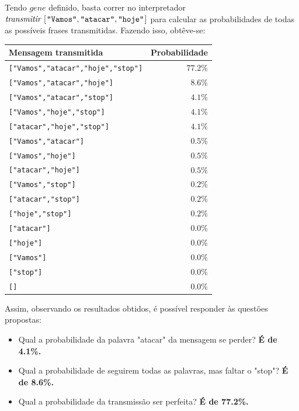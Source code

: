\documentclass[11pt, a4paper, fleqn]{article}
\newcommand{\Varid}[1]{\mathit{#1}}
\begin{document}
Tendo \ensuremath{\Varid{gene}} definido, basta correr no interpretador \ensuremath{\Varid{transmitir}\;[\mskip1.5mu \text{\ttfamily \char34 Vamos\char34},\text{\ttfamily \char34 atacar\char34},\text{\ttfamily \char34 hoje\char34}\mskip1.5mu]} para calcular as probabilidades de todas as possíveis frases transmitidas. Fazendo isso, obtêve-se:

\begin{center}
\begin{tabular}{l r}
Mensagem transmitida & Probabilidade \\ \hline
\texttt{["Vamos","atacar","hoje","stop"]} & $77.2\%$ \\
\texttt{["Vamos","atacar","hoje"]} & $8.6\%$ \\
\texttt{["Vamos","atacar","stop"]} & $4.1\%$ \\
\texttt{["Vamos","hoje","stop"]} & $4.1\%$ \\
\texttt{["atacar","hoje","stop"]} & $4.1\%$ \\
\texttt{["Vamos","atacar"]} & $0.5\%$ \\
\texttt{["Vamos","hoje"]} & $0.5\%$ \\
\texttt{["atacar","hoje"]} & $0.5\%$ \\
\texttt{["Vamos","stop"]} & $0.2\%$ \\
\texttt{["atacar","stop"]} & $0.2\%$ \\
\texttt{["hoje","stop"]} & $0.2\%$ \\
\texttt{["atacar"]} & $0.0\%$ \\
\texttt{["hoje"]} & $0.0\%$ \\
\texttt{["Vamos"]} & $0.0\%$ \\
\texttt{["stop"]} & $0.0\%$ \\
\texttt{[]} & $0.0\%$ \\
\end{tabular}
\end{center}

Assim, observando os resultados obtidos, é possível responder às questões propostas:

\begin{itemize}
     \item Qual a probabilidade da palavra "atacar" da mensagem se perder? 
     \textbf {É de 4.1\%.}
     \item Qual a probabilidade de seguirem todas as palavras, mas faltar o "stop"?
     \textbf {É de 8.6\%.}
     \item Qual a probabilidade da transmissão ser perfeita?
     \textbf {É de 77.2\%.}
\end{itemize}
\end{document}
